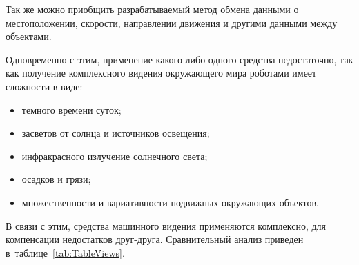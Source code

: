 Так же можно приобщить разрабатываемый метод обмена данными о местоположении, скорости, направлении движения и другими данными между объектами.

Одновременно с этим, применение какого-либо одного средства недостаточно, так как получение комплексного видения окружающего мира роботами имеет сложности в виде:

\begin{itemize}
    \item темного времени суток;
    \item засветов от солнца и источников освещения;
    \item инфракрасного излучение солнечного света;
    \item осадков и грязи;
    \item множественности и вариативности подвижных окружающих объектов.
\end{itemize}

В связи с этим, средства машинного видения применяются комплексно, для компенсации недостатков друг-друга. Сравнительный анализ приведен в~таблице~\ref{tab:TableViews}.

